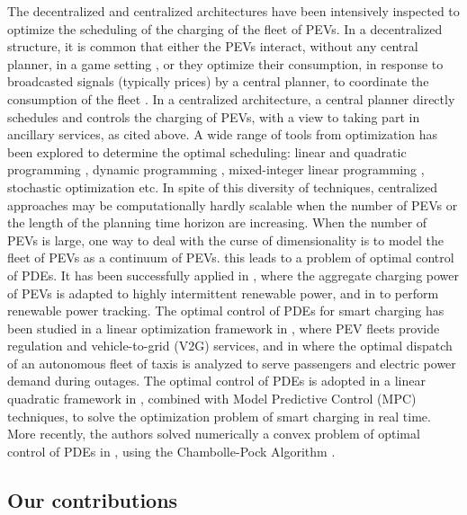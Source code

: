 \documentclass[conference]{IEEEtran}
\begin{document}
The decentralized and centralized architectures have been intensively inspected to optimize the scheduling of the charging of the fleet of PEVs. In a decentralized structure, it is common that either the PEVs interact, without any central planner, in a game setting \cite{couillet2012mean,ma2011decentralized}, or they optimize their consumption, in response to broadcasted signals (typically prices) by a central planner, to coordinate the consumption of the fleet \cite{gan2012optimal}.
In a centralized architecture, a central planner directly schedules and controls the charging of PEVs, with a view to taking part in ancillary services, as cited above. A wide range of tools from optimization has been explored to determine the optimal scheduling: linear and quadratic programming \cite{ayyadi2019optimal,mets2010optimizing}, dynamic programming \cite{lopez2018demand}, mixed-integer linear programming \cite{franco2015mixed}, stochastic optimization \cite{luo2017stochastic} etc. 
In spite of this diversity of techniques, centralized approaches may be computationally hardly scalable when the number of PEVs or the length of the planning time horizon are increasing. When the number of PEVs is large, one way to deal with the curse of dimensionality \cite{bellman2015adaptive} is to model the fleet of PEVs as a continuum of PEVs. this leads to a problem of optimal control of PDEs. It has been successfully applied in 
 \cite{bashash2011transport}, where the  aggregate charging power of PEVs is adapted to highly intermittent renewable power, and in \cite{ebrahimi2014aggregate} to perform renewable power tracking. The optimal control of PDEs for smart charging has been studied in a linear optimization framework in  \cite{le2015optimal},  where PEV fleets provide  regulation and vehicle-to-grid (V2G) services, and in \cite{sheppard2017optimal} where the optimal dispatch of an autonomous fleet of taxis is analyzed to serve
passengers and electric power demand during outages. The optimal control of PDEs is adopted in a linear quadratic framework  in \cite{le2016pde}, combined with Model Predictive Control (MPC) techniques, to solve the optimization problem of smart charging in real time. More recently, the authors solved numerically  a convex problem of optimal control of PDEs in \cite{seguret2021mean}, using the Chambolle-Pock Algorithm \cite{chambolle2011first}.

\subsection{Our contributions}
\end{document}
